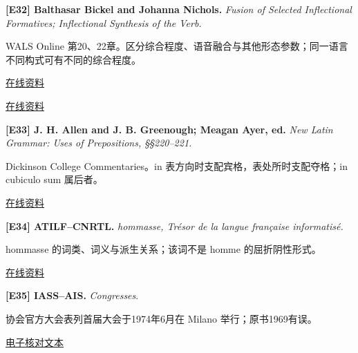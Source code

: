 \par\noindent\begin{minipage}{\linewidth}
\label{ref-32}\noindent\textbf{[E32] Balthasar Bickel and Johanna Nichols.} \textit{Fusion of Selected Inflectional Formatives; Inflectional Synthesis of the Verb.}\par\nobreak
WALS Online 第20、22章。区分综合程度、语音融合与其他形态参数；同一语言不同构式可有不同的综合程度。\par
{\small\href{https://wals.info/chapter/20}{在线资料}}\par
{\small\href{https://wals.info/chapter/22}{在线资料}}\par
\par\end{minipage}\par

\par\noindent\begin{minipage}{\linewidth}
\label{ref-33}\noindent\textbf{[E33] J. H. Allen and J. B. Greenough; Meagan Ayer, ed.} \textit{New Latin Grammar: Uses of Prepositions, §§220–221.}\par\nobreak
Dickinson College Commentaries。in 表方向时支配宾格，表处所时支配夺格；in cubiculo sum 属后者。\par
{\small\href{https://dcc.dickinson.edu/grammar/latin/uses-prepositions}{在线资料}}\par
\par\end{minipage}\par

\par\noindent\begin{minipage}{\linewidth}
\label{ref-34}\noindent\textbf{[E34] ATILF–CNRTL.} \textit{hommasse, Trésor de la langue française informatisé.}\par\nobreak
hommasse 的词类、词义与派生关系；该词不是 homme 的屈折阴性形式。\par
{\small\href{https://www.cnrtl.fr/definition/hommasse}{在线资料}}\par
\par\end{minipage}\par

\par\noindent\begin{minipage}{\linewidth}
\label{ref-35}\noindent\textbf{[E35] IASS–AIS.} \textit{Congresses}.\par\nobreak
协会官方大会表列首届大会于1974年6月在 Milano 举行；原书1969有误。\par
{\small\href{https://iass-ais.org/congresses/}{电子核对文本}}\par
\par\end{minipage}\par

